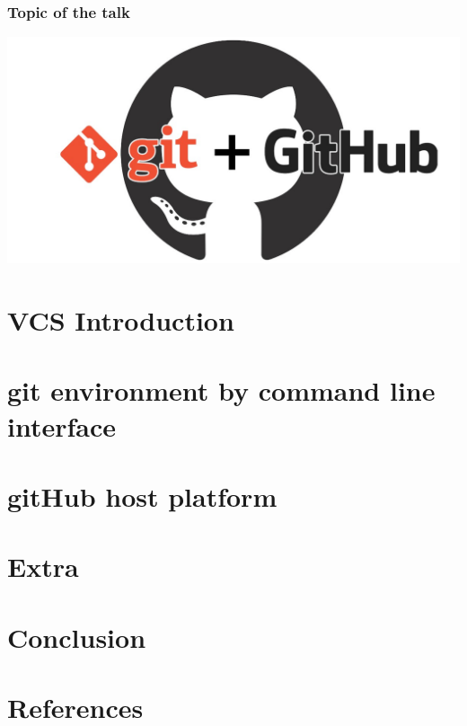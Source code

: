 \documentclass{beamer}
\begin{document}
\begin{frame}
	\frametitle{Topic of the talk}
	\addtocounter{nframe}{1}

	\begin{center}
		\includegraphics[width=.7\textwidth]{./imgs/git-github.jpeg}
	\end{center}


\end{frame}



\section{VCS Introduction}


\section{git environment by command line interface}


\section{gitHub host platform}


\section{Extra}


\section{Conclusion}


\section*{References}

\end{document}
